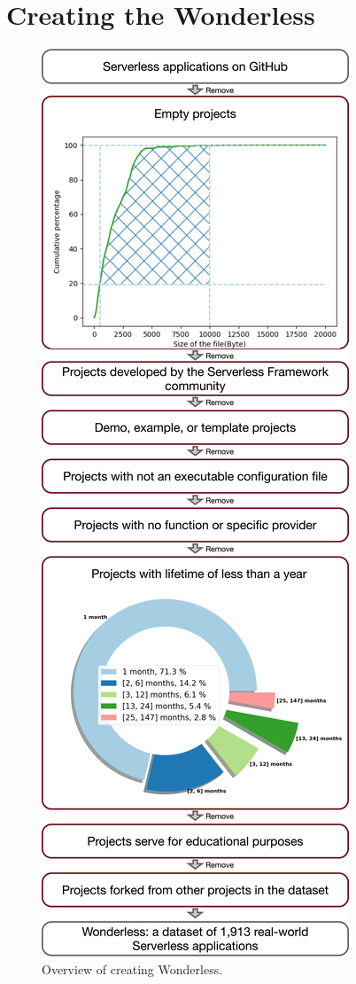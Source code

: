 
\section{Creating the Wonderless}
\label{dataset}

\begin{figure}
	\centering
	\includegraphics[scale=0.55]{figures/processOverview}
	\caption{Overview of creating Wonderless.}
	\label{fig:overview}
\end{figure}


